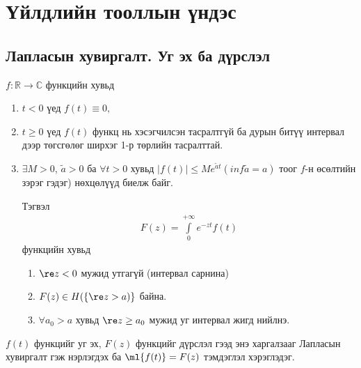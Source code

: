
\chapter{Үйлдлийн тооллын үндэс} 
\section{Лапласын хувиргалт. Уг эх ба дүрслэл} 
\begin{thm}
 $f:\mathbb{R}\rightarrow \mathbb{C}$ функцийн хувьд
 \begin{enumerate}
     \item $t<0$ үед $f(t)\equiv 0,$
     \item $t\geq 0$ үед $f(t)$ функц нь хэсэгчилсэн тасралтгүй ба дурын битүү интервал дээр төгсгөлөг ширхэг 1-р төрлийн тасралттай.
     \item $\exists M>0$, $\tilde{a}>0$ ба $\forall t>0$ хувьд $|f(t)|\leq Me^{\tilde{a}t} (inf \tilde{a}=a)$ тоог $f$-н өсөлтийн зэрэг гэдэг) нөхцөлүүд биелж байг.
     
     Тэгвэл
     \begin{eqnarray} \label{10.1}
      F(z)=\int\limits_0^{+\infty} e^{-zt}f(t)
     \end{eqnarray}
     функцийн хувьд
     \begin{enumerate}
         \item [a)] $\re z<0$ мужид утгагүй (интервал сарнина)
         \item [б)] $F(z)\in H (\{\re z>a)\}$ байна. 
         \item[В)] $\forall a_0>a$ хувьд $\re z\geq a_0$ мужид уг интервал жигд нийлнэ.
     \end{enumerate}
 \end{enumerate}
\end{thm}
\begin{dfn}
$f(t)$ функцийг уг эх, $F(z)$ функцийг дүрслэл гээд энэ харгалзааг Лапласын хувиргалт  гэж нэрлэгдэх ба $\ml{f(t)}=F(z)$ тэмдэглэл хэрэглэдэг.
\end{dfn}
